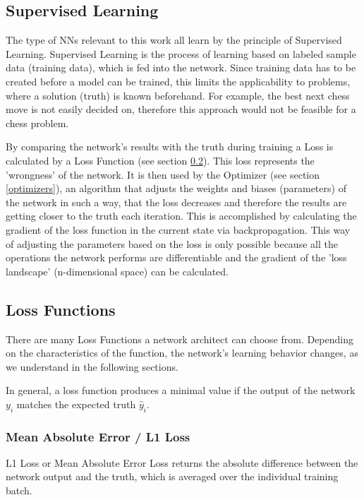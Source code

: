 \documentclass[a4paper,10pt]{scrartcl}
\begin{document}
\subsection{Supervised Learning}
\label{supervised-learning}

The type of NNs relevant to this work all learn by the principle of Supervised Learning.
Supervised Learning is the process of learning based on labeled sample data (training data), which is fed into the network.
Since training data has to be created before a model can be trained, this limits the applicability to problems, where a solution (truth) is known beforehand.
For example, the best next chess move is not easily decided on, therefore this approach would not be feasible for a chess problem.

By comparing the network's results with the truth during training a Loss is calculated by a Loss Function (see section \ref{loss}).
This loss represents the 'wrongness' of the network.
It is then used by the Optimizer (see section \ref{optimizers}), an algorithm that adjusts the weights and biases (parameters) of the network in such a way, that the loss decreases and therefore the results are getting closer to the truth each iteration.
This is accomplished by calculating the gradient of the loss function in the current state via backpropagation.
This way of adjusting the parameters based on the loss is only possible because all the operations the network performs are differentiable and the gradient of the 'loss landscape' (n-dimensional space) can be calculated.

\subsection{Loss Functions}
\label{loss}

There are many Loss Functions a network architect can choose from.
Depending on the characteristics of the function, the network's learning behavior changes, as we understand in the following sections.

In general, a loss function produces a minimal value if the output of the network $y_i$ matches the expected truth $\hat{y}_i$.

\subsubsection*{Mean Absolute Error / L1 Loss}

L1 Loss or Mean Absolute Error Loss returns the absolute difference between the network output and the truth, which is averaged over the individual training batch.
\end{document}
